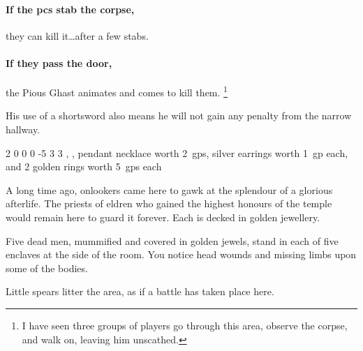 \begin{multicols}{2}
\paragraph{If the \glspl{pc} stab the corpse,}
they can kill it\ldots after a few stabs.

\paragraph{If they pass the door,}
the Pious Ghast animates and comes to kill them.%
\footnote{I have seen three groups of players go through this area, observe the corpse, and walk on, leaving him unscathed.}

His use of a shortsword also means he will not gain any penalty from the narrow hallway.


  {2}%
  {0}%
  {{0}%
  {0}%
  {-5}}%
  {3}%
  {3}%
  {}%
  {\shortsword, \completeplate, pendant necklace worth 2~\glspl{gp}, silver earrings worth 1~\gls{gp} each, and 2 golden rings worth 5~\glspl{gp} each}%
  {
    \setcounter{Academics}{1}
    \setcounter{Stealth}{2}
    \setcounter{Tactics}{2}
    \setcounter{Vigilance}{1}
    \undead
  }


A long time ago, onlookers came here to gawk at the splendour of a glorious afterlife.
The priests of \gls{eldren} who gained the highest honours of the temple would remain here to guard it forever.
Each is decked in golden jewellery.

\begin{boxtext}

  Five dead men, mummified and covered in golden jewels, stand in each of five enclaves at the side of the room.
  You notice head wounds and missing limbs upon some of the bodies.

  Little spears litter the area, as if a battle has taken place here.

\end{boxtext}





\end{multicols}
